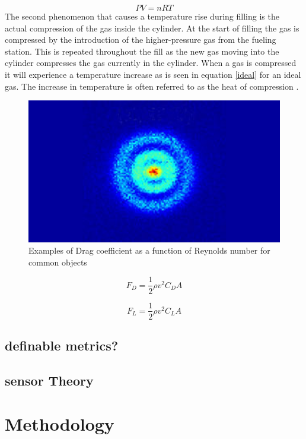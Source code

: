 \documentclass[paper=a4, fontsize=11pt, abstract=on]{scrartcl}
\numberwithin{equation}{section}		%
\numberwithin{figure}{section}			%
\numberwithin{table}{section}				%
\begin{document}
\begin{equation}
\label{ideal}
PV= nRT
\end{equation}
The second phenomenon that causes a temperature rise during filling is the actual compression of the gas inside the cylinder. At the start of filling the gas is compressed by the introduction of the higher-pressure gas from the fueling station. This is repeated throughout the fill as the new gas moving into the cylinder compresses the gas currently in the cylinder. When a gas is compressed it will experience a temperature increase as is seen in equation \ref{ideal} for an ideal gas. The increase in temperature is often referred to as the heat of compression \cite{dick}. 
\begin{figure}[H]
\centering
\includegraphics[width=0.8\linewidth]{hyd}
\caption{Examples of Drag coefficient as a function of Reynolds number for common objects}
\label{comp}
\end{figure}

 \begin{equation}
\label{drag}
F_D= \frac{1}{2}\rho v^2C_DA
\end{equation}


 \begin{equation}
\label{lift}
F_L= \frac{1}{2}\rho v^2C_LA
\end{equation}

\subsection{definable metrics?}


\subsection{sensor Theory}

\section{Methodology}
\end{document}
